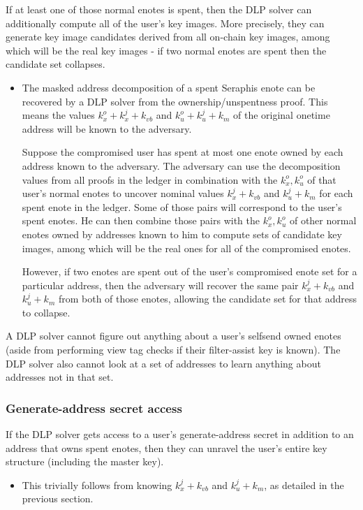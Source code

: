 If at least one of those normal enotes is spent, then the DLP solver can additionally compute all of the user's key images. More precisely, they can generate key image candidates derived from all on-chain key images, among which will be the real key images - if two normal enotes are spent then the candidate set collapses.
\begin{itemize}
    \item The masked address decomposition of a spent Seraphis enote can be recovered by a DLP solver from the ownership/unspentness proof. This means the values $k^o_x + k^j_x + k_{vb}$ and $k^o_u + k^j_u + k_m$ of the original onetime address will be known to the adversary.

    Suppose the compromised user has spent at most one enote owned by each address known to the adversary. The adversary can use the decomposition values from all proofs in the ledger in combination with the $k^o_x, k^o_u$ of that user's normal enotes to uncover nominal values $k^j_x + k_{vb}$ and $k^j_u + k_m$ for each spent enote in the ledger. Some of those pairs will correspond to the user's spent enotes. He can then combine those pairs with the $k^o_x, k^o_u$ of other normal enotes owned by addresses known to him to compute sets of candidate key images, among which will be the real ones for all of the compromised enotes.

    However, if two enotes are spent out of the user's compromised enote set for a particular address, then the adversary will recover the same pair $k^j_x + k_{vb}$ and $k^j_u + k_m$ from both of those enotes, allowing the candidate set for that address to collapse.
\end{itemize}

A DLP solver cannot figure out anything about a user's selfsend owned enotes (aside from performing view tag checks if their filter-assist key is known). The DLP solver also cannot look at a set of addresses to learn anything about addresses not in that set.

\subsubsection{Generate-address secret access}
\label{subsubsec:jamtis-forward-secrecy-generate-address-access}

If the DLP solver gets access to a user's generate-address secret in addition to an address that owns spent enotes, then they can unravel the user's entire key structure (including the master key).
\begin{itemize}
    \item This trivially follows from knowing $k^j_x + k_{vb}$ and $k^j_u + k_m$, as detailed in the previous section.
\end{itemize}

